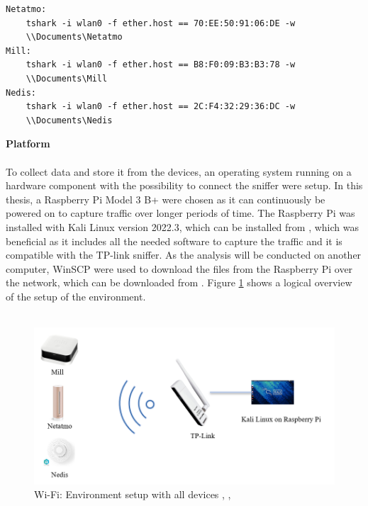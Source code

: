 \newpage
\begin{verbatim}
Netatmo:
    tshark -i wlan0 -f ether.host == 70:EE:50:91:06:DE -w 
    \\Documents\Netatmo
Mill:
    tshark -i wlan0 -f ether.host == B8:F0:09:B3:B3:78 -w 
    \\Documents\Mill
Nedis:
    tshark -i wlan0 -f ether.host == 2C:F4:32:29:36:DC -w 
    \\Documents\Nedis
\end{verbatim}

\textbf{Platform}\\\\
To collect data and store it from the devices, an operating system running on a hardware component with the possibility to connect the sniffer were setup. In this thesis, a Raspberry Pi Model 3 B+ were chosen as it can continuously be powered on to capture traffic over longer periods of time. The Raspberry Pi was installed with Kali Linux version 2022.3, which can be installed from \cite{KaliLinux}, which was beneficial as it includes all the needed software to capture the traffic and it is compatible with the TP-link sniffer. As the analysis will be conducted on another computer, WinSCP were used to download the files from the Raspberry Pi over the network, which can be downloaded from \cite{WinSCP}. Figure \ref{fig:Environment} shows a logical overview of the setup of the environment.  
\\\\
\begin{figure} [H]
    \centering
    \includegraphics[width=1\textwidth]{figures/Environment.png}
    \caption{Wi-Fi: Environment setup with all devices \cite{MillSense}, \cite{NetatmoDevice}, \cite{NedisDevice}}
    \label{fig:Environment}
\end{figure}

